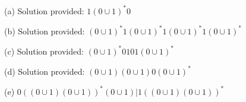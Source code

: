 
(a) Solution provided: $1 (0 \cup 1)^* 0$

(b) Solution provided: $(0 \cup 1)^* 1 (0 \cup 1)^* 1 (0 \cup 1)^* 1 (0 \cup 1)^*$

(c) Solution provided: $(0 \cup 1)^* 0101 (0 \cup 1)^*$

(d) Solution provided: $(0 \cup 1)(0 \cup 1)0(0 \cup 1)^*$

(e) $0((0 \cup 1)(0 \cup 1))^* (0 \cup 1) | 1((0 \cup 1)(0 \cup 1))^*$
